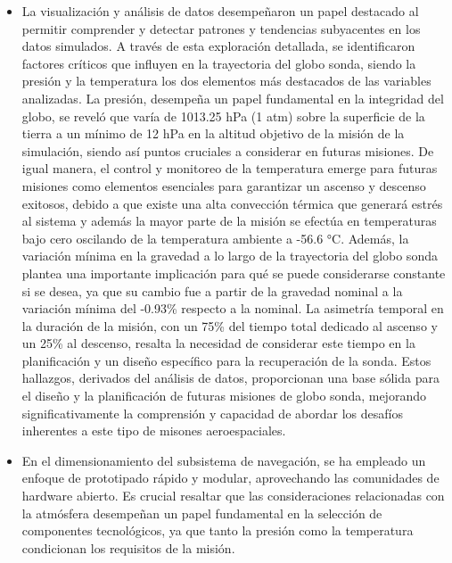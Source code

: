 \begin{itemize}
    \item La visualización y análisis de datos desempeñaron un papel destacado al permitir comprender y detectar patrones y tendencias subyacentes en los datos simulados. A través de esta exploración detallada, se identificaron factores críticos que influyen en la trayectoria del globo sonda, siendo la presión y la temperatura los dos elementos más destacados de las variables analizadas. La presión, desempeña un papel fundamental en la integridad del globo, se reveló que varía de 1013.25 hPa (1 atm) sobre la superficie de la tierra a un mínimo de 12 hPa en la altitud objetivo de la misión de la simulación, siendo así puntos cruciales a considerar en futuras misiones. De igual manera, el control y monitoreo de la temperatura emerge para futuras misiones como elementos esenciales para garantizar un ascenso y descenso exitosos, debido a que existe una alta convección térmica que generará estrés al sistema y además la mayor parte de la misión se efectúa en temperaturas bajo cero oscilando de la temperatura ambiente a -56.6 °C. Además, la variación mínima en la gravedad a lo largo de la trayectoria del globo sonda plantea una importante implicación para qué se puede considerarse constante si se desea, ya que  su cambio fue a partir de la gravedad nominal a  la variación mínima del -0.93\% respecto a la nominal. La asimetría temporal en la duración de la misión, con un 75\% del tiempo total dedicado al ascenso y un 25\% al descenso, resalta la necesidad de considerar este tiempo en la planificación y un diseño específico para la recuperación de la sonda. Estos hallazgos, derivados del análisis de datos, proporcionan una base sólida para el diseño y la planificación de futuras misiones de globo sonda, mejorando significativamente la comprensión y capacidad de abordar los desafíos inherentes a este tipo de misones aeroespaciales.
    \item En el dimensionamiento del subsistema de navegación, se ha empleado un enfoque de prototipado rápido y modular, aprovechando las comunidades de hardware abierto. Es crucial resaltar que las consideraciones relacionadas con la atmósfera desempeñan un papel fundamental en la selección de componentes tecnológicos, ya que tanto la presión como la temperatura condicionan los requisitos de la misión.
\newpage

\end{itemize}

